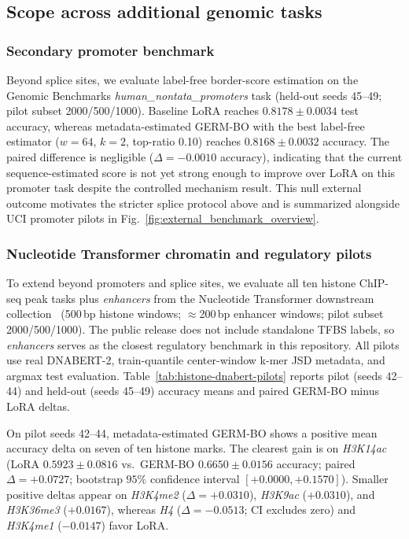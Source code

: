 \documentclass[12pt,letterpaper]{article}
\newcommand{\splitname}[1]{\textit{#1}}
\begin{document}
\subsection*{Scope across additional genomic tasks}

\subsubsection*{Secondary promoter benchmark}

Beyond splice sites, we evaluate label-free border-score estimation on the Genomic Benchmarks \splitname{human\_nontata\_promoters} task (held-out seeds 45--49; pilot subset 2000/500/1000). Baseline LoRA reaches $0.8178 \pm 0.0034$ test accuracy, whereas metadata-estimated GERM-BO with the best label-free estimator ($w=64$, $k=2$, top-ratio 0.10) reaches $0.8168 \pm 0.0032$ accuracy. The paired difference is negligible ($\Delta=-0.0010$ accuracy), indicating that the current sequence-estimated score is not yet strong enough to improve over LoRA on this promoter task despite the controlled mechanism result. This null external outcome motivates the stricter splice protocol above and is summarized alongside UCI promoter pilots in Fig.~\ref{fig:external_benchmark_overview}.

\subsubsection*{Nucleotide Transformer chromatin and regulatory pilots}

To extend beyond promoters and splice sites, we evaluate all ten histone ChIP-seq peak tasks plus \splitname{enhancers} from the Nucleotide Transformer downstream collection~\cite{nucleotidetransformer2024} (500\,bp histone windows; $\approx$200\,bp enhancer windows; pilot subset 2000/500/1000). The public release does not include standalone TFBS labels, so \splitname{enhancers} serves as the closest regulatory benchmark in this repository. All pilots use real DNABERT-2, train-quantile center-window k-mer JSD metadata, and argmax test evaluation. Table~\ref{tab:histone-dnabert-pilots} reports pilot (seeds 42--44) and held-out (seeds 45--49) accuracy means and paired GERM-BO minus LoRA deltas.

On pilot seeds 42--44, metadata-estimated GERM-BO shows a positive mean accuracy delta on seven of ten histone marks. The clearest gain is on \splitname{H3K14ac} (LoRA $0.5923 \pm 0.0816$ vs.\ GERM-BO $0.6650 \pm 0.0156$ accuracy; paired $\Delta=+0.0727$; bootstrap $95\%$ confidence interval $[+0.0000, +0.1570]$). Smaller positive deltas appear on \splitname{H3K4me2} ($\Delta=+0.0310$), \splitname{H3K9ac} ($+0.0310$), and \splitname{H3K36me3} ($+0.0167$), whereas \splitname{H4} ($\Delta=-0.0513$; CI excludes zero) and \splitname{H3K4me1} ($-0.0147$) favor LoRA.
\end{document}
